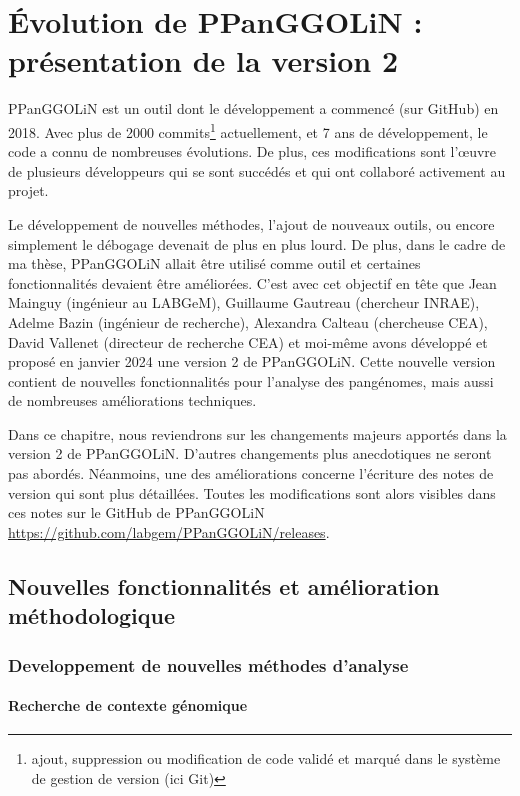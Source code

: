 \chapter{Évolution de PPanGGOLiN : présentation de la version 2}

PPanGGOLiN est un outil dont le développement a commencé (sur GitHub) en 2018. Avec plus de 2000 commits\footnote{ajout, suppression ou modification de code validé et marqué dans le système de gestion de version (ici Git)} actuellement, et 7 ans de développement, le code a connu de nombreuses évolutions. De plus, ces modifications sont l'\oe uvre de plusieurs développeurs qui se sont succédés et qui ont collaboré activement au projet.

Le développement de nouvelles méthodes, l'ajout de nouveaux outils, ou encore simplement le débogage devenait de plus en plus lourd. De plus, dans le cadre de ma thèse, PPanGGOLiN allait être utilisé comme outil et certaines fonctionnalités devaient être améliorées. C'est avec cet objectif en tête que Jean Mainguy (ingénieur au LABGeM), Guillaume Gautreau (chercheur INRAE), Adelme Bazin (ingénieur de recherche), Alexandra Calteau (chercheuse CEA), David Vallenet (directeur de recherche CEA) et moi-même avons développé et proposé en janvier 2024 une version 2 de PPanGGOLiN. Cette nouvelle version contient de nouvelles fonctionnalités pour l'analyse des pangénomes, mais aussi de nombreuses améliorations techniques.

Dans ce chapitre, nous reviendrons sur les changements majeurs apportés dans la version 2 de PPanGGOLiN. D'autres changements plus anecdotiques ne seront pas abordés. Néanmoins, une des améliorations concerne l'écriture des notes de version qui sont plus détaillées. Toutes les modifications sont alors visibles dans ces notes sur le GitHub de PPanGGOLiN \url{https://github.com/labgem/PPanGGOLiN/releases}.

\section{Nouvelles fonctionnalités et amélioration méthodologique}
\subsection{Developpement de nouvelles méthodes d’analyse}
\subsubsection{Recherche de contexte génomique}

